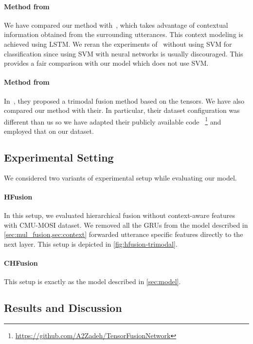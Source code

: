 \documentclass[review]{elsarticle}
\newcommand\?[1]{\hl{#1}}
\begin{document}
\paragraph{Method from~\citep{porcon}}
We have compared our method with~\citep{pordep}, which takes
advantage of contextual information obtained from the surrounding
utterances. This context modeling is achieved using LSTM. We reran the
experiments of~\citet{pordep} without using SVM for classification since using
SVM with neural networks is usually discouraged. This provides a fair comparison
with our model which does not use SVM.

\paragraph{Method from~\citep{zadten}}
In~\citep{zadten}, they proposed a trimodal fusion method based on the tensors. We have also compared our method with their. In particular, their dataset configuration was different than us so we have adapted their publicly available code ~\footnote{\url{https://github.com/A2Zadeh/TensorFusionNetwork}} and employed that on our dataset.
\subsection{Experimental Setting}
\label{sec:exp_set}

We considered two variants of experimental setup while evaluating our model.

\paragraph{HFusion} In this setup, we evaluated hierarchical fusion
without context-aware features with CMU-MOSI dataset. We removed all the GRUs
from the model described in \cref{sec:mul_fusion,sec:context} forwarded
utterance specific features directly to the next layer. This setup is depicted
in \cref{fig:hfusion-trimodal}. %

\paragraph{CHFusion} This setup is exactly as the model described in
\cref{sec:model}.

\subsection{Results and Discussion}
\end{document}
